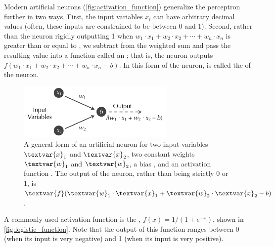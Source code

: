 Modern artificial neurons (\autoref{fig:activation_function}) generalize the perceptron further in two ways. First, the input variables $x_i$ can have arbitrary decimal values (often, these inputs are constrained to be between 0 and 1). Second, rather than the neuron rigidly outputting 1 when $w_1 \cdot x_1 + w_2 \cdot x_2 + \cdots + w_n \cdot x_n$ is greater than or equal to , we subtract  from the weighted sum and pass the resulting value into a function  called an ; that is, the neuron outputs $f(w_1 \cdot x_1 + w_2 \cdot x_2 + \cdots + w_n \cdot x_n - b)$. In this form of the neuron,  is called the  of the neuron.

\begin{figure}[h]
\centering
\mySfFamily
\includegraphics[width = 0.68\textwidth]{../images/activation_function.png}
\caption{A general form of an artificial neuron for two input variables $\textvar{x}_\text{1}$ and $\textvar{x}_\text{2}$, two constant weights $\textvar{w}_\text{1}$ and $\textvar{w}_\text{2}$, a bias , and an activation function . The output of the neuron, rather than being strictly 0 or 1, is $\textvar{f}(\textvar{w}_\text{1} \cdot \textvar{x}_\text{1} + \textvar{w}_\text{2} \cdot \textvar{x}_\text{2} - b)$.}
\label{fig:activation_function}
\end{figure}

A commonly used activation function is the , $f(x) = 1/(1+e^{-x})$, shown in \autoref{fig:logistic_function}. Note that the output of this function ranges between 0 (when its input is very negative) and 1 (when its input is very positive).\\



